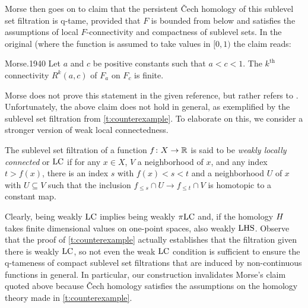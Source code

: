 Morse then goes on to claim that the persistent \v{C}ech homology of this sublevel set filtration is q-tame, provided that $F$ is bounded from below and satisfies the assumptions of local $F$-connectivity and compactness of sublevel sets.
In the original (where the function is assumed to take values in $[0,1)$ the claim reads:
\begin{displaycquote}[Theorem 6.3, p.~432]{Morse.1940}
	Let $a$ and $c$ be positive constants such that $a < c < 1$.
	The $k^{\mathrm{th}}$ connectivity $R^k(a,c)$ of $F_a$ on $F_c$ is finite.
\end{displaycquote}
Morse does not prove this statement in the given reference, but rather refers to \cite[Theorem~6.1]{Morse.1938}.
Unfortunately, the above claim does not hold in general, as exemplified by the sublevel set filtration from \cref{t:counterexample}.
To elaborate on this, we consider a stronger version of weak local connectedness.

\begin{defi}
	The sublevel set filtration of a function $f \colon X \to \mathbb{R}$ is said to be \emph{weakly locally connected} or $\mathrm{LC}$ if for any $x \in X$, $V$ a neighborhood of $x$, and any index $t > f(x)$, there is an index $s$ with $f(x) < s < t$ and a neighborhood $U$ of $x$ with $U \subseteq V$ such that the inclusion $f_{\leq s} \cap U \to f_{\leq t} \cap V$ is homotopic to a constant map.
\end{defi}

Clearly, being weakly $\mathrm{LC}$ implies being weakly $\pi\mathrm{LC}$ and, if the homology $H$ takes finite dimensional values on one-point spaces, also weakly $\mathrm{LHS}$.
Observe that the proof of \cref{t:counterexample} actually establishes that the filtration given there is weakly $\mathrm{LC}$, so not even the weak $\mathrm{LC}$ condition is sufficient to ensure the q-tameness of compact sublevel set filtrations that are induced by non-continuous functions in general.
In particular, our construction invalidates Morse's claim quoted above because \v{C}ech homology satisfies the assumptions on the homology theory made in \cref{t:counterexample}.

